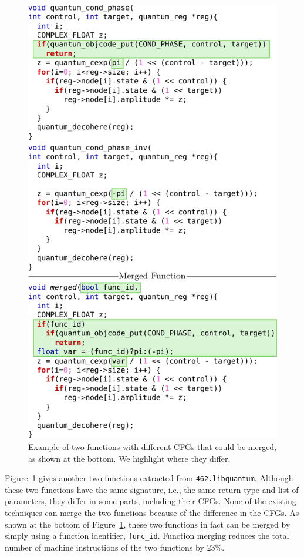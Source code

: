 \begin{figure}[t!]
  \centering
  \includegraphics[width=\linewidth]{figs/libquantum-example.pdf}
  \caption{Example of two functions with different CFGs that could be merged, as shown at the bottom.
           We highlight where they differ.}
  \label{fig:libquantum-example}
\end{figure}


Figure~\ref{fig:libquantum-example} gives another two functions extracted from \texttt{462.libquantum}. Although these two functions have
the same signature, i.e., the same return type and list of parameters, they differ in some parts, including their CFGs. None of the
existing techniques can merge the two functions because of the difference in the CFGs. As shown at the bottom of
Figure~\ref{fig:libquantum-example}, these two functions in fact can be merged by simply using a function identifier, \texttt{func\_id}.
Function merging reduces the total number of machine instructions of the two functions by 23\%.

